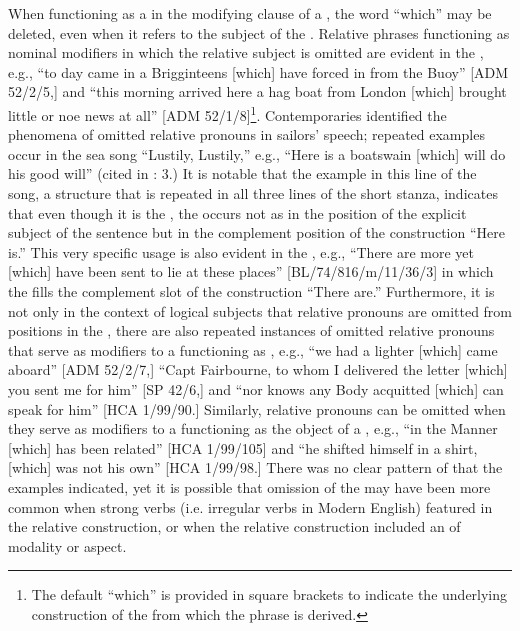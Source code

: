 When functioning as a  in the modifying clause of a , the word “which” may be deleted, even when it refers to the subject of the . Relative phrases functioning as nominal modifiers in which the relative subject  is omitted are evident in the , e.g., “to day came in a Brigginteens [which] have forced in from the Buoy” [ADM 52/2/5,] and “this morning arrived here a hag boat from London [which] brought little or noe news at all” [ADM 52/1/8]\footnote{The default  “which” is provided in square brackets to indicate the underlying construction of the  from which the phrase is derived.}. Contemporaries identified the phenomena of omitted relative pronouns in sailors’ speech; repeated examples occur in the sea song “Lustily, Lustily,” e.g., “Here is a boatswain [which] will do his good will” (cited in \citealt{Palmer1986}: 3.) It is notable that the example in this line of the song, a structure that is repeated in all three lines of the short stanza, indicates that even though it is the , the  occurs not as in the position of the explicit subject of the sentence but in the complement position of the  construction “Here is.” This very specific usage is also evident in the , e.g., “There are more yet [which] have been sent to lie at these places” [BL/74/816/m/11/36/3] in which the  fills the complement slot of the  construction “There are.” Furthermore, it is not only in the context of logical subjects that relative pronouns are omitted from positions in the , there are also repeated instances of omitted relative pronouns that serve as modifiers to a  functioning as , e.g., “we had a lighter [which] came aboard” [ADM 52/2/7,] “Capt Fairbourne, to whom I delivered the letter [which] you sent me for him” [SP 42/6,] and “nor knows any Body acquitted [which] can speak for him” [HCA 1/99/90.] Similarly, relative pronouns can be omitted when they serve as modifiers to a  functioning as the object of a , e.g., “in the Manner [which] has been related” [HCA 1/99/105] and “he shifted himself in a shirt, [which] was not his own” [HCA 1/99/98.] There was no clear pattern of  that the  examples indicated, yet it is possible that omission of the  may have been more common when strong verbs (i.e. irregular verbs in Modern English) featured in the relative construction, or when the relative construction included an  of modality or aspect. 

